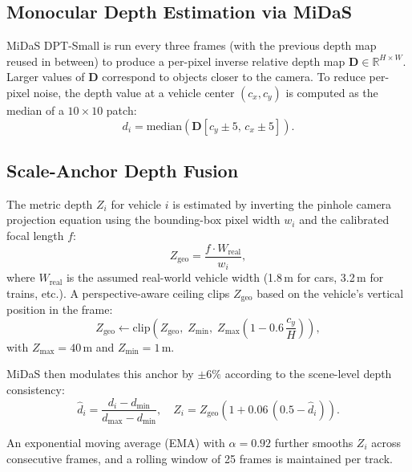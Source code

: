 \documentclass[conference]{IEEEtran}
\begin{document}
\subsection{Monocular Depth Estimation via MiDaS}
MiDaS DPT-Small \cite{ranftl2022midas} is run every three
frames (with the previous depth map reused in between) to
produce a per-pixel inverse relative depth map
$\mathbf{D} \in \mathbb{R}^{H \times W}$. Larger values of
$\mathbf{D}$ correspond to objects closer to the camera. To
reduce per-pixel noise, the depth value at a vehicle center
$(c_x, c_y)$ is computed as the median of a $10 \times 10$
patch:
\begin{equation}
  d_i = \mathrm{median}\!\left(
    \mathbf{D}[c_y\!\pm\!5,\, c_x\!\pm\!5]
  \right).
\end{equation}

\subsection{Scale-Anchor Depth Fusion}
The metric depth $Z_i$ for vehicle $i$ is estimated by
inverting the pinhole camera projection equation using the
bounding-box pixel width $w_i$ and the calibrated focal
length $f$:
\begin{equation}
  Z_{\text{geo}} = \frac{f \cdot W_{\text{real}}}{w_i},
  \label{eq:geoz}
\end{equation}
where $W_{\text{real}}$ is the assumed real-world vehicle width
(1.8\,m for cars, 3.2\,m for trains, etc.). A
perspective-aware ceiling clips $Z_{\text{geo}}$ based on the
vehicle's vertical position in the frame:
\begin{equation}
  Z_{\text{geo}} \leftarrow
  \mathrm{clip}\!\left(Z_{\text{geo}},\;
    Z_{\min},\;
    Z_{\max}\!\left(1 - 0.6\,\frac{c_y}{H}\right)
  \right),
\end{equation}
with $Z_{\max} = 40$\,m and $Z_{\min} = 1$\,m.

MiDaS then modulates this anchor by $\pm 6\%$ according to
the scene-level depth consistency:
\begin{equation}
  \hat{d}_i = \frac{d_i - d_{\min}}{d_{\max} - d_{\min}},
  \quad
  Z_i = Z_{\text{geo}}\!\left(1 + 0.06\,(0.5 - \hat{d}_i)\right).
  \label{eq:fusion}
\end{equation}

An exponential moving average (EMA) with $\alpha = 0.92$
further smooths $Z_i$ across consecutive frames, and a rolling
window of 25 frames is maintained per track.
\end{document}
